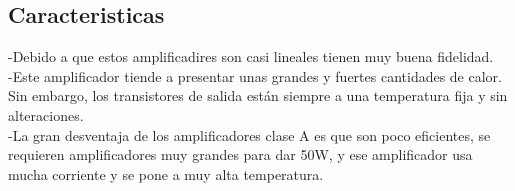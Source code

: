 \documentclass[12pt,a4paper]{report}
\begin{document}
\subsection{Caracteristicas}
-Debido a que estos amplificadires son casi lineales tienen muy buena  fidelidad.\\
-Este amplificador tiende a presentar unas grandes y fuertes cantidades de calor. Sin embargo, los transistores de salida están siempre a una temperatura fija y sin alteraciones.\\
-La gran desventaja de los amplificadores clase A es que son poco eficientes, se requieren amplificadores muy grandes para dar 50W, y ese amplificador usa mucha corriente y se pone a muy alta temperatura.\\
\end{document}
